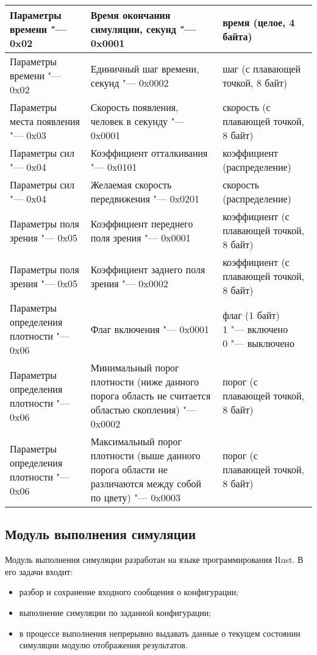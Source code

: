 \begin{longtable}[ht]{| >{\centering}m{}
                      | >{\centering}m{}
                      | >{\centering\arraybackslash}m{}|}
  \hline Параметры времени "--- 0x02 & Время окончания симуляции, секунд "--- 0x0001 & время (целое, 4 байта) \tabularnewline
  \hline Параметры времени "--- 0x02 & Единичный шаг времени, секунд "--- 0x0002 & шаг (с плавающей точкой, 8 байт) \tabularnewline

  \hline Параметры места появления "--- 0x03 & Скорость появления, человек в секунду "--- 0x0001 & скорость (с плавающей точкой, 8 байт) \tabularnewline

  \hline Параметры сил "--- 0x04 & Коэффициент отталкивания "--- 0x0101 & коэффициент (распределение) \tabularnewline
  \hline Параметры сил "--- 0x04 & Желаемая скорость передвижения "--- 0x0201 & скорость (распределение) \tabularnewline

  \hline Параметры поля зрения "--- 0x05 & Коэффициент переднего поля зрения "--- 0x0001 & коэффициент (с плавающей точкой, 8 байт) \tabularnewline
  \hline Параметры поля зрения "--- 0x05 & Коэффициент заднего поля зрения "--- 0x0002 & коэффициент (с плавающей точкой, 8 байт) \tabularnewline

  \hline Параметры определения плотности "--- 0x06 & Флаг включения "--- 0x0001 & \specialcell{флаг (1 байт)\\
                                                                                               1 "--- включено\\
                                                                                               0 "--- выключено} \tabularnewline
  \hline Параметры определения плотности "--- 0x06 & Минимальный порог плотности (ниже данного порога область не считается областью скопления) "--- 0x0002 & порог (с плавающей точкой, 8 байт) \tabularnewline
  \hline Параметры определения плотности "--- 0x06 & Максимальный порог плотности (выше данного порога области не различаются между собой по цвету) "--- 0x0003 & порог (с плавающей точкой, 8 байт) \tabularnewline

  \hline
\end{longtable}

\subsection{Модуль выполнения симуляции}
\label{sec:development:core}

Модуль выполнения симуляции разработан на языке программирования Rust.
В его задачи входит:
\begin{itemize}
  \item разбор и сохранение входного сообщения о конфигурации;
  \item выполнение симуляции по заданной конфигурации;
  \item в процессе выполнения непрерывно выдавать данные о текущем состоянии симуляции модулю отображения результатов.
\end{itemize}

